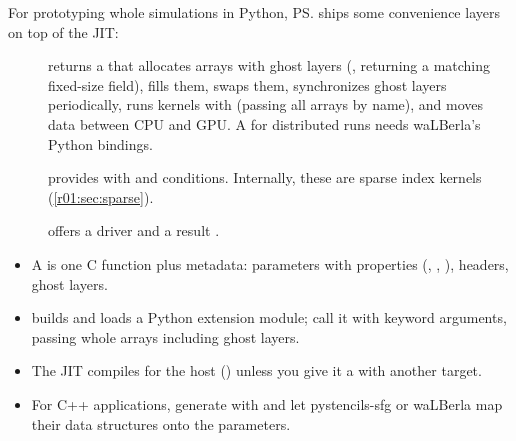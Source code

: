For prototyping whole simulations in Python, \ps{} ships some convenience layers on top
of the JIT:
\begin{description}
  \item[]
        returns a  that allocates arrays with ghost layers
        (, returning a matching fixed-size field), fills them, swaps
        them, synchronizes ghost layers periodically, runs kernels with
         (passing all arrays by name), and moves data
        between CPU and GPU. A  for distributed runs needs
        waLBerla's Python bindings.
  \item[] provides  with
         and  conditions. Internally, these are sparse index
        kernels (\cref{r01:sec:sparse}).
  \item[] offers a  driver and a
        result .
\end{description}

\begin{keyidea}[Summary]
  \begin{itemize}[leftmargin=1.2em]
    \item A  is one C function plus metadata: parameters with properties
          (, , ), headers, ghost
          layers.
    \item {} builds and loads a Python extension module; call it with
          keyword arguments, passing whole arrays including ghost layers.
    \item The JIT compiles for the host () unless you give it a
           with another target.
    \item For C++ applications, generate with  and let pystencils-sfg or
          waLBerla map their data structures onto the parameters.
  \end{itemize}
\end{keyidea}
